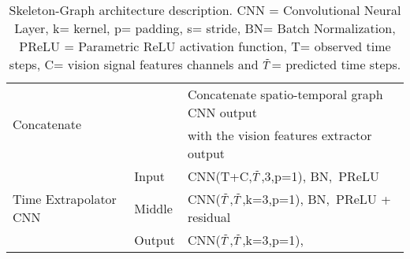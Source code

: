 \documentclass[10pt,twocolumn,letterpaper]{article}
\newcommand*{\ours}{Skeleton-Graph }
\begin{document}
\begin{table*}[ht]
\begin{tabular}{l|l|l}
\hline
\multirow{2}{*}{Concatenate}               & \multirow{2}{*}{}        & Concatenate spatio-temporal graph CNN output~                                                                                                                                                                                                         \\
                                           &                          & with the vision features extractor output                                                                                                                                                                                                             \\ 
\hline
\multirow{3}{*}{Time Extrapolator CNN}     & Input                    & CNN(T+C,$\Tilde{T}$,3,p=1), BN,~PReLU                                                                                                                                                                                                                           \\
                                           & Middle                   & CNN($\Tilde{T}$,$\Tilde{T}$,k=3,p=1), BN,~PReLU + residual~                                                                                                                                                                                                               \\
                                           & Output                   & CNN($\Tilde{T}$,$\Tilde{T}$,k=3,p=1),                                                                                                                                                                                                                                     \\
\bottomrule
\end{tabular}
\caption{ \ours architecture description. CNN = Convolutional Neural Layer, k= kernel, p= padding, s= stride, BN= Batch Normalization, PReLU = Parametric ReLU activation function, T= observed time steps, C= vision signal features channels and $\Tilde{T}$= predicted time steps.}
\label{tab:arch}
\end{table*}
\end{document}
